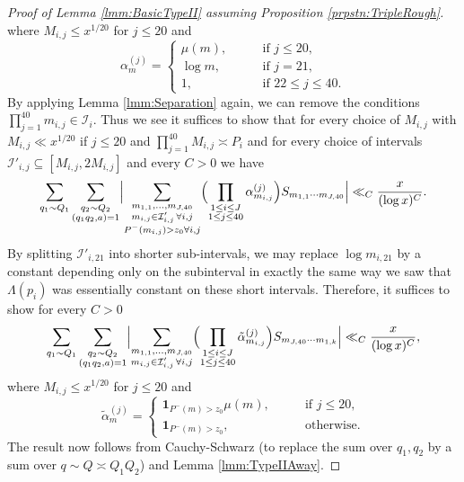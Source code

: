 \documentclass[10pt]{amsart}
\theoremstyle{plain}
\numberwithin{equation}{section}
\begin{document}
\begin{proof}[Proof of Lemma \ref{lmm:BasicTypeII} assuming Proposition \ref{prpstn:TripleRough}]
\[ \]
 where $M_{i,j}\le x^{1/20}$ for $j\le 20$ and
 \[
 \alpha^{(j)}_m=\begin{cases}
 \mu(m),\qquad &\text{if }j\le 20,\\
 \log{m},&\text{if }j=21,\\
 1,&\text{if }22\le j\le 40.
 \end{cases}
 \]
By applying Lemma \ref{lmm:Separation} again, we can remove the conditions $\prod_{j=1}^{40}m_{i,j}\in\mathcal{I}_i$. Thus we see it suffices to show that for every choice of $M_{i,j}$ with $M_{i,j}\ll x^{1/20}$ if $j\le 20$ and $\prod_{j=1}^{40} M_{i,j}\asymp P_i$ and for every choice of intervals $\mathcal{I}'_{i,j}\subseteq[M_{i,j},2M_{i,j}]$ and every $C>0$ we have
 \[
 \sum_{q_1\sim Q_1}\sum_{\substack{q_2\sim Q_2\\ (q_1q_2,a)=1}}\Bigl|\sum_{\substack{m_{1,1},\dots, m_{J,40}\\ m_{i,j}\in  \mathcal{I}'_{i,j}\,\forall i,j\\ P^-(m_{i,j})>z_0\forall i,j }}\Bigl(\prod_{\substack{1\le i\le J\\ 1\le j\le 40}}\alpha_{m_{i,j}}^{(j)}\Bigr) S_{m_{1,1}\cdots m_{J,40}}\Bigr|\ll_{C}\frac{x}{(\log{x})^{C}}.
  \]
  By splitting $\mathcal{I}'_{i,21}$ into shorter sub-intervals, we may replace $\log{m_{i,21}}$ by a constant depending only on the subinterval in exactly the same way we saw that $\Lambda(p_i)$ was essentially constant on these short intervals. Therefore, it suffices to show for every $C>0$
   \[
\sum_{q_1\sim Q_1}\sum_{\substack{q_2\sim Q_2\\ (q_1q_2,a)=1}}\Bigl|\sum_{\substack{m_{1,1},\dots, m_{J,40}\\ m_{i,j}\in  \mathcal{I}'_{i,j}\,\forall i,j }}\Bigl(\prod_{\substack{1\le i\le J\\ 1\le j\le 40}}\tilde{\alpha}_{m_{i,j}}^{(j)}\Bigr) S_{m_{J,40}\cdots m_{1,k}}\Bigr|\ll_{C}\frac{x}{(\log{x})^{C}},
  \]
  where $M_{i,j}\le x^{1/20}$ for $j\le 20$ and
  \[
  \tilde{\alpha}^{(j)}_{m}=\begin{cases}
 \mathbf{1}_{P^-(m)>z_0}\mu(m),\qquad &\text{if }j\le 20,\\
 \mathbf{1}_{P^-(m)>z_0},&\text{otherwise}.
 \end{cases}
 \]
 The result now follows from Cauchy-Schwarz (to replace the sum over $q_1,q_2$ by a sum over $q\sim Q\asymp Q_1Q_2$) and Lemma \ref{lmm:TypeIIAway}.
\end{proof}
%
%
%
%
%
%
%
%
\end{document}
